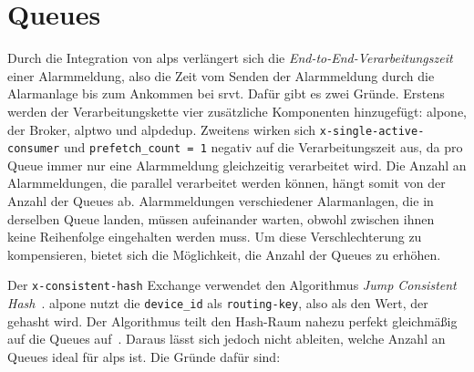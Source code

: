 \section{Queues}
\label{sec:alps-queues}

Durch die Integration von \gls{alps} verlängert sich die \textit{End-to-End-Verarbeitungszeit} einer Alarmmeldung, also die Zeit vom Senden der Alarmmeldung durch die Alarmanlage bis zum Ankommen bei \gls{srvt}. Dafür gibt es zwei Gründe. Erstens werden der Verarbeitungskette vier zusätzliche Komponenten hinzugefügt: \gls{alpone}, der Broker, \gls{alptwo} und \gls{alpdedup}. Zweitens wirken sich \texttt{x-single-active-\allowbreak consumer} und \texttt{prefetch\_count = 1} negativ auf die Verarbeitungszeit aus, da pro Queue immer nur eine Alarmmeldung gleichzeitig verarbeitet wird. Die Anzahl an Alarmmeldungen, die parallel verarbeitet werden können, hängt somit von der Anzahl der Queues ab. Alarmmeldungen verschiedener Alarmanlagen, die in derselben Queue landen, müssen aufeinander warten, obwohl zwischen ihnen keine Reihenfolge eingehalten werden muss. Um diese Verschlechterung zu kompensieren, bietet sich die Möglichkeit, die Anzahl der Queues zu erhöhen.

Der \texttt{x-consistent-hash} Exchange verwendet den Algorithmus \textit{Jump Consistent Hash}~\citep{lamping2014}. \gls{alpone} nutzt die \texttt{device\_id} als \texttt{routing-key}, also als den Wert, der gehasht wird. Der Algorithmus teilt den Hash-Raum nahezu perfekt gleichmäßig auf die Queues auf~\citep{lamping2014}. Daraus lässt sich jedoch nicht ableiten, welche Anzahl an Queues ideal für \gls{alps} ist. Die Gründe dafür sind:

